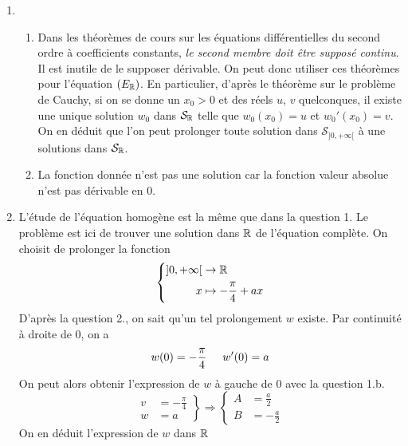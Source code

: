 \begin{enumerate}
\begin{enumerate}
\end{enumerate}
 \item 
\begin{enumerate}
 \item Dans les théorèmes de cours sur les équations différentielles du second ordre à coefficients constants, \emph{le second membre doit être supposé continu}. Il est inutile de le supposer dérivable. On peut donc utiliser ces théorèmes pour l'équation $(E_{\mathbb{R}})$. En particulier, d'après le théorème sur le problème de Cauchy, si on se donne un $x_0>0$ et des réels $u$, $v$ quelconques, il existe une unique solution $w_0$ dans $\mathcal{S}_{\mathbb{R}}$ telle que $w_0(x_0)=u$ et $w_0'(x_0)=v$. On en déduit que l'on peut prolonger toute solution dans $\mathcal{S}_{]0,+\infty[}$ à une solutions dans $\mathcal{S}_{\mathbb{R}}$.
 \item La fonction donnée n'est pas une solution car la fonction valeur absolue n'est pas dérivable en $0$.
\end{enumerate}
\item L'étude de l'équation homogène est la même que dans la question 1. Le problème est ici de trouver une solution dans $\mathbb{R}$ de l'équation complète. On choisit de prolonger la fonction 
\begin{displaymath}
 \left\lbrace 
\begin{aligned}
 ]0,+\infty[ &\rightarrow \mathbb{R} \\ x &\mapsto -\frac{\pi}{4} +ax
\end{aligned}
\right. 
\end{displaymath}
D'après la question 2., on sait qu'un tel prolongement $w$ existe. Par continuité à droite de $0$, on a
\begin{displaymath}
 w(0) = -\frac{\pi}{4}\hspace{0.5cm} w'(0) = a
\end{displaymath}
On peut alors obtenir l'expression de $w$ à gauche de $0$ avec la question 1.b.
\begin{displaymath}
\left. 
\begin{aligned}
 v &= -\frac{\pi}{4} \\ w &= a
\end{aligned}
\right\rbrace 
\Rightarrow
\left\lbrace 
\begin{aligned}
 A &= \frac{a}{2} \\ B &= -\frac{a}{2} 
\end{aligned}
\right. 
\end{displaymath}
On en déduit l'expression de $w$ dans $\mathbb{R}$
\begin{displaymath}

\end{displaymath}
\end{enumerate}
